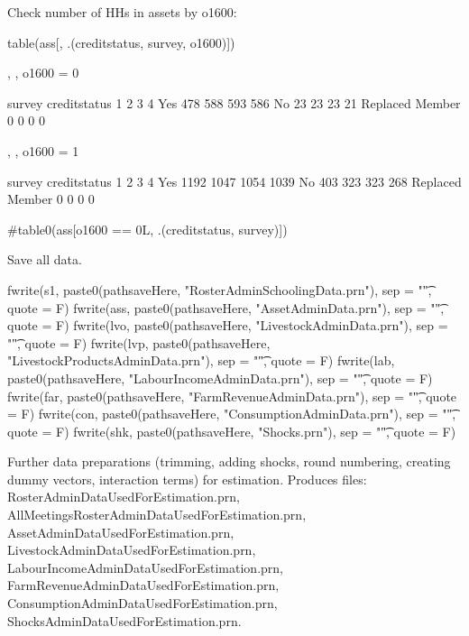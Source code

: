 Check number of HHs in assets by \textsf{o1600}:
\begin{Schunk}
\begin{Sinput}
table(ass[, .(creditstatus, survey, o1600)])
\end{Sinput}
\begin{Soutput}
, , o1600 = 0

                 survey
creditstatus         1    2    3    4
  Yes              478  588  593  586
  No                23   23   23   21
  Replaced Member    0    0    0    0

, , o1600 = 1

                 survey
creditstatus         1    2    3    4
  Yes             1192 1047 1054 1039
  No               403  323  323  268
  Replaced Member    0    0    0    0
\end{Soutput}
\begin{Sinput}
#table0(ass[o1600 == 0L, .(creditstatus, survey)])
\end{Sinput}
\end{Schunk}
Save all data.

\begin{Schunk}
\begin{Sinput}
fwrite(s1, paste0(pathsaveHere, "RosterAdminSchoolingData.prn"), sep = "\t", quote = F)
fwrite(ass, paste0(pathsaveHere, "AssetAdminData.prn"), sep = "\t", quote = F)
fwrite(lvo, paste0(pathsaveHere, "LivestockAdminData.prn"), sep = "\t", quote = F)
fwrite(lvp, paste0(pathsaveHere, "LivestockProductsAdminData.prn"), sep = "\t", quote = F)
fwrite(lab, paste0(pathsaveHere, "LabourIncomeAdminData.prn"), sep = "\t", quote = F)
fwrite(far, paste0(pathsaveHere, "FarmRevenueAdminData.prn"), sep = "\t", quote = F)
fwrite(con, paste0(pathsaveHere, "ConsumptionAdminData.prn"), sep = "\t", quote = F)
fwrite(shk, paste0(pathsaveHere, "Shocks.prn"), sep = "\t", quote = F)
\end{Sinput}
\end{Schunk}




Further data preparations (trimming, adding shocks, round numbering, creating dummy vectors, interaction terms) for estimation. Produces files: \textsf{\footnotesize RosterAdminDataUsedForEstimation.prn, AllMeetingsRosterAdminDataUsedForEstimation.prn, AssetAdminDataUsedForEstimation.prn, LivestockAdminDataUsedForEstimation.prn, LabourIncomeAdminDataUsedForEstimation.prn, FarmRevenueAdminDataUsedForEstimation.prn, ConsumptionAdminDataUsedForEstimation.prn, ShocksAdminDataUsedForEstimation.prn}.


